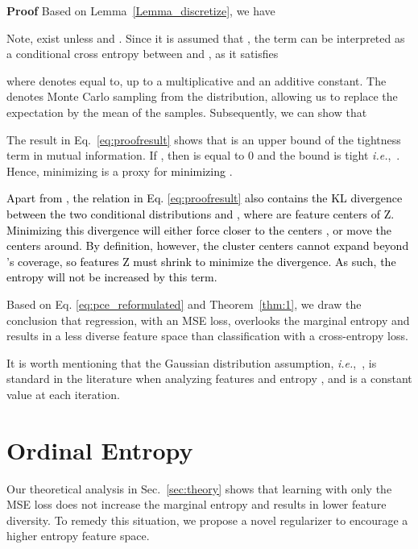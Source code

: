 \documentclass{article} \usepackage{iclr2023_conference,times}
\makeatletter
\newcommand*{\ie}{i.e.\@\xspace}
\def\ie{\mbox{\textit{i.e.}, }}
\newenvironment*{proof}{\textbf{Proof}\quad}{\hfill \par\vspace{2pt}}
\def\shihao{\textcolor{black}}
\makeatother
\begin{document}
\begin{proof}
Based on Lemma~\ref{Lemma_discretize}, we have



Note,  exist unless  and .
Since it is assumed that , the term  can be interpreted as a conditional cross entropy between  and , as it satisfies

where  denotes equal to, up to a multiplicative and an additive constant.  The  denotes Monte Carlo sampling from the  distribution, allowing us to replace the expectation by the mean of the samples. Subsequently, we can show that 

The {result} in Eq.~\ref{eq:proofresult} shows that  is an upper bound of the tightness term in mutual information.  
If , then  is equal to 0 and the bound is tight \ie .
Hence, minimizing  is a proxy for \shihao{minimizing} .


\shihao{Apart from , the relation in Eq. \ref{eq:proofresult} also contains the KL divergence between the two conditional distributions  and , where  are feature centers of Z.  Minimizing this divergence will either force  closer to the centers , or move the centers  around. By definition, however, the cluster centers  cannot expand beyond ’s coverage, so features Z must shrink to minimize the divergence. As such, the entropy  will not be increased by this term.}
\end{proof}

Based on 
Eq. \ref{eq:pce_reformulated}
and Theorem~\ref{thm:1}, we draw the conclusion that regression, with an MSE loss, overlooks the marginal entropy  and results in a less diverse feature space than classification with a cross-entropy loss.





It is worth mentioning that the Gaussian distribution assumption, \ie , is standard in the literature when analyzing features \citep{yang2021free,salakhutdinov2012one} and entropy \citep{misra2005estimation}, and  is a constant value at each iteration.

\section{Ordinal Entropy}

Our theoretical analysis in Sec.~\ref{sec:theory} shows that learning with only the MSE loss does not increase the marginal entropy  and results in lower feature diversity.  To remedy this situation, we propose a novel
regularizer to encourage a higher entropy feature space. 
\end{document}
